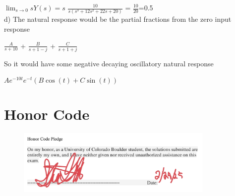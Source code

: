 \documentclass{article}
\begin{document}
$\lim_{s \to 0} sY(s)=s$ $\frac{10}{s(s^3+12s^2+22s+20)}$ = $\frac{10}{20}$=0.5 \\ 

d) The natural response would be the partial fractions from the zero input response  

$\frac{A}{s+10}$ + $\frac{B}{s+1-j}$ + $\frac{C}{s+1+j}$  

So it would have some negative decaying oscillatory natural response  

$Ae^{-10t}e^{-t} (B \cos(t) + C \sin(t))$

\section*{Honor Code}

\begin{figure}[H]
    \centering
    \includegraphics[width=0.85\textwidth]{honorCode.jpg}
\end{figure}
\end{document}
